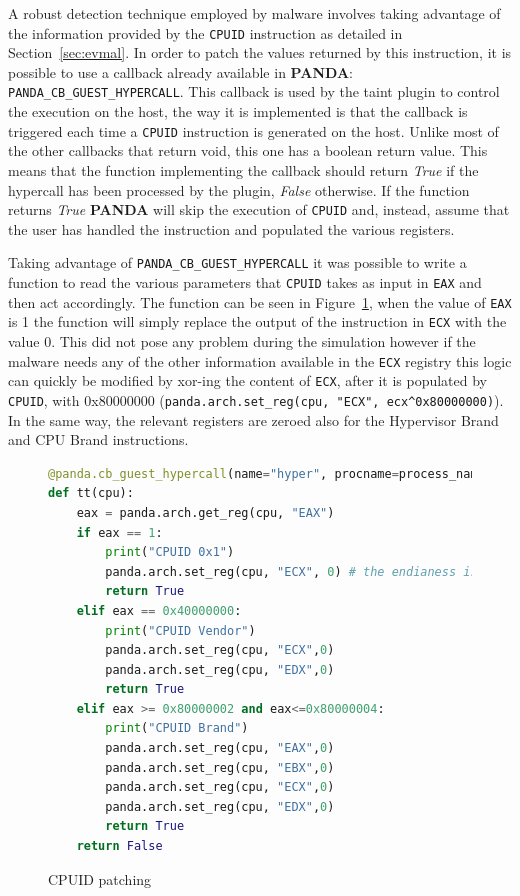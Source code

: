 A robust detection technique employed by malware involves taking advantage of the information provided by the \lstinline{CPUID} instruction as detailed in Section~\ref{sec:evmal}. In order to patch the values returned by this instruction, it is possible to use a callback already available in \textbf{PANDA}: \lstinline{PANDA_CB_GUEST_HYPERCALL}. This callback is used by the taint plugin to control the execution on the host, the way it is implemented is that the callback is triggered each time a \lstinline{CPUID} instruction is generated on the host. Unlike most of the other callbacks that return void, this one has a boolean return value. This means that the function implementing the callback should return \textit{True} if the hypercall has been processed by the plugin, \textit{False} otherwise. If the function returns \textit{True} \textbf{PANDA} will skip the execution of \lstinline{CPUID} and, instead, assume that the user has handled the instruction and populated the various registers. 

Taking advantage of \lstinline{PANDA_CB_GUEST_HYPERCALL} it was possible to write a function to read the various parameters that \lstinline{CPUID} takes as input in \lstinline{EAX} and then act accordingly. The function can be seen in Figure~\ref{fig:cpuidpat}, when the value of \lstinline{EAX} is 1 the function will simply replace the output of the instruction in \lstinline{ECX} with the value 0. This did not pose any problem during the simulation however if the malware needs any of the other information available in the \lstinline{ECX} registry this logic can quickly be modified by xor-ing the content of \lstinline{ECX}, after it is populated by \lstinline{CPUID}, with 0x80000000 (\lstinline{panda.arch.set_reg(cpu, "ECX", ecx^0x80000000)}). In the same way, the relevant registers are zeroed also for the Hypervisor Brand and CPU Brand instructions.

\begin{figure}[htp]
\centering
\begin{lstlisting}[language=Python] 
@panda.cb_guest_hypercall(name="hyper", procname=process_name)
def tt(cpu):
    eax = panda.arch.get_reg(cpu, "EAX")
    if eax == 1:
        print("CPUID 0x1")
        panda.arch.set_reg(cpu, "ECX", 0) # the endianess is swapped (?)
        return True
    elif eax == 0x40000000:
        print("CPUID Vendor")
        panda.arch.set_reg(cpu, "ECX",0)
        panda.arch.set_reg(cpu, "EDX",0)
        return True
    elif eax >= 0x80000002 and eax<=0x80000004:
        print("CPUID Brand")
        panda.arch.set_reg(cpu, "EAX",0)
        panda.arch.set_reg(cpu, "EBX",0)
        panda.arch.set_reg(cpu, "ECX",0)
        panda.arch.set_reg(cpu, "EDX",0)
        return True
    return False
\end{lstlisting}
\caption{CPUID patching}
\label{fig:cpuidpat}
\end{figure}


